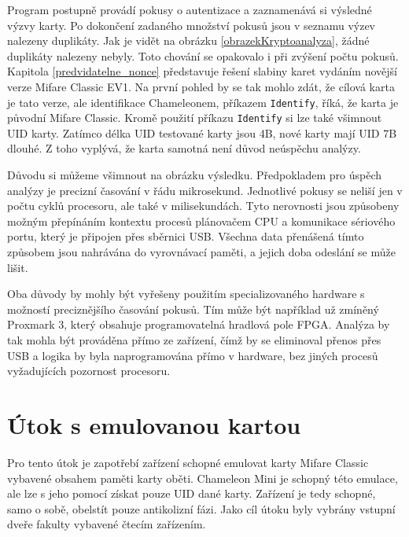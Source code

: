 Program postupně provádí pokusy o autentizace a zaznamenává si výsledné výzvy karty. Po dokončení zadaného množství pokusů jsou v seznamu výzev nalezeny duplikáty. Jak je vidět na obrázku \ref{obrazekKryptoanalyza}, žádné duplikáty nalezeny nebyly. Toto chování se opakovalo i při zvýšení počtu pokusů. Kapitola \ref{predvidatelne_nonce} představuje řešení slabiny karet vydáním novější verze Mifare Classic EV1. Na první pohled by se tak mohlo zdát, že cílová karta je tato verze, ale identifikace Chameleonem, příkazem \verb|Identify|, říká, že karta je původní Mifare Classic. Kromě použití příkazu \verb|Identify| si lze také všimnout UID karty. Zatímco délka UID testované karty jsou 4B, nové karty mají UID 7B dlouhé\cite{Mifare_Classic_Official_about}. Z toho vyplývá, že karta samotná není důvod neúspěchu analýzy.\par
Důvodu si můžeme všimnout na obrázku výsledku. Předpokladem pro úspěch analýzy je precizní časování v řádu mikrosekund. Jednotlivé pokusy se neliší jen v počtu cyklů procesoru, ale také v milisekundách. Tyto nerovnosti jsou způsobeny možným přepínáním kontextu procesů plánovačem CPU a komunikace sériového portu, který je připojen přes sběrnici USB. Všechna data přenášená tímto způsobem jsou nahrávána do vyrovnávací paměti, a jejich doba odeslání se může lišit\cite{RelayUtokBP}.\par
Oba důvody by mohly být vyřešeny použitím specializovaného hardware s možností preciznějšího časování pokusů. Tím může být například už zmíněný Proxmark 3, který obsahuje programovatelná hradlová pole FPGA\cite{Proxmark}. Analýza by tak mohla být prováděna přímo ze zařízení, čímž by se eliminoval přenos přes USB a logika by byla naprogramována přímo v hardware, bez jiných procesů vyžadujících pozornost procesoru.

\section{Útok s emulovanou kartou}
Pro tento útok je zapotřebí zařízení schopné emulovat karty Mifare Classic vybavené obsahem paměti karty oběti. Chameleon Mini je schopný této emulace, ale lze s jeho pomocí získat pouze UID dané karty. Zařízení je tedy schopné, samo o sobě, obelstít pouze antikolizní fázi. Jako cíl útoku byly vybrány vstupní dveře fakulty vybavené čtecím zařízením. \par

